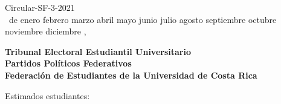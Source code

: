 \documentclass[12pt]{article}
\newcommand{\MONTH}{%
  \ifcase\the\month
  \or enero%
  \or febrero%
  \or marzo%
  \or abril%
  \or mayo%
  \or junio%
  \or julio%
  \or agosto%
  \or septiembre%
  \or octubre%
  \or noviembre%
  \or diciembre%
  \fi}
\begin{document}
\begin{flushright}
  Circular-SF-3-2021\\
  \medskip
  \the\day\ de \MONTH, \the\year
\end{flushright}
\medskip
\begin{flushleft}\begin{spacing}{1}
  \textbf{Tribunal Electoral Estudiantil Universitario\\
  Partidos  Políticos Federativos\\
  Federación de Estudiantes de la Universidad de Costa Rica}
\end{spacing}\end{flushleft}

\noindent Estimados estudiantes:\par
\end{document}
